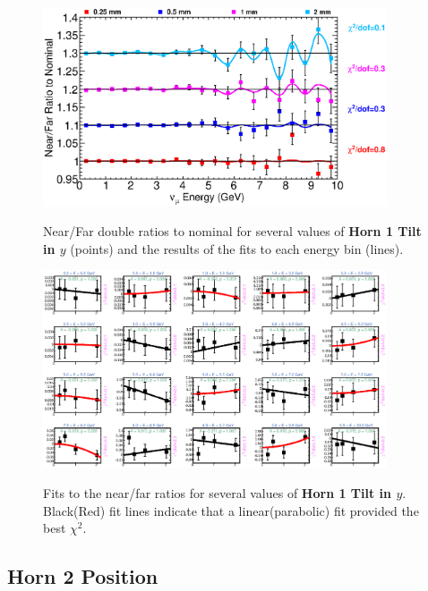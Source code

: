 \begin{figure}[ht]
  \begin{center}
    {\includegraphics[width=4.0in]{figures/Horn1YTilt_nof_summary.eps}}
  \end{center}
\caption{ Near/Far double ratios to nominal for several values of {\bf Horn 1 Tilt in $y$} (points) and the results of the fits to each energy bin (lines).}
\end{figure}


\begin{figure}[hb]
  \begin{center}
    {\includegraphics[width=4.0in]{figures/Horn1YTilt_nof_fits.eps}}
  \end{center}
\caption{ Fits to the near/far ratios for several values of {\bf Horn 1 Tilt in $y$}. Black(Red) fit lines indicate that a linear(parabolic) fit provided the best $\chi^2$. }
\end{figure}

\clearpage
\subsection{Horn 2 Position}

